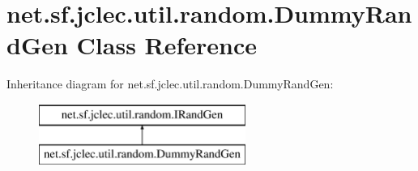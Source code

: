 \hypertarget{classnet_1_1sf_1_1jclec_1_1util_1_1random_1_1_dummy_rand_gen}{\section{net.\-sf.\-jclec.\-util.\-random.\-Dummy\-Rand\-Gen Class Reference}
\label{classnet_1_1sf_1_1jclec_1_1util_1_1random_1_1_dummy_rand_gen}
}
Inheritance diagram for net.\-sf.\-jclec.\-util.\-random.\-Dummy\-Rand\-Gen\-:\begin{figure}[H]
\begin{center}
\leavevmode
\includegraphics[height=2.000000cm]{classnet_1_1sf_1_1jclec_1_1util_1_1random_1_1_dummy_rand_gen}
\end{center}
\end{figure}
